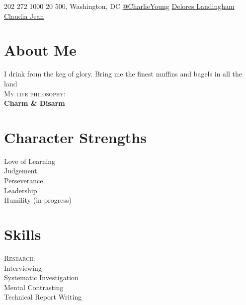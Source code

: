 \documentclass{rmjCV}
\begin{document}
	
\vspace{0.15cm}
\vspace{0.15cm}
 {202 272 1000} {20 500, Washington, DC} {\href{https://twitter.com} {\faTwitter \hspace{0.1cm}@CharlieYoung}} {\href{https://github.com}{\faGithub \hspace{0.1cm}Delores Landingham}} {\href{https://www.linkedin.com}{\faLinkedin \hspace{0.1cm}Claudia Jean}}

\setlength{\columnsep}{0.5cm}

\begin{paracol}{2}

\begin{leftcolumn}

\section{About Me}
I drink from the keg of glory. Bring me the finest muffins and bagels in all the land\\

\noindent \textsc{My life philosophy:}\\
\textbf{Charm \& Disarm}

\section{Character Strengths}	 
Love of Learning\\ %
Judgement\\ %
Perseverance\\ %
Leadership\\ %
Humility (in-progress) %

\section{Skills}
\noindent \textsc{Research:}\\
Interviewing\\
Systematic Investigation\\
Mental Contrasting\\
Technical Report Writing\\


\end{leftcolumn}
\end{paracol}
\end{document}
